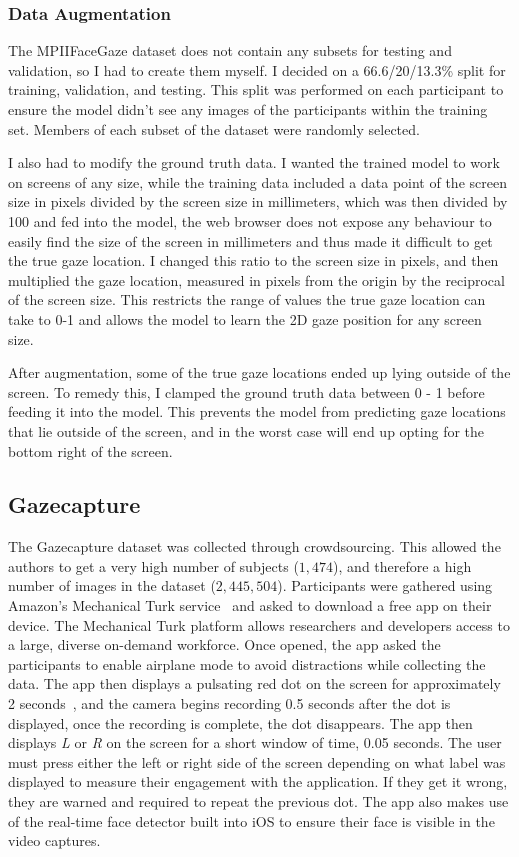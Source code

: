 \documentclass{report}
\begin{document}
\subsubsection{Data Augmentation}

The MPIIFaceGaze dataset does not contain any subsets for testing and validation, so I had to create them myself. I decided on a 66.6/20/13.3\% split for training, validation, and testing. This split was performed on each participant to ensure the model didn't see any images of the participants within the training set. Members of each subset of the dataset were randomly selected. 

I also had to modify the ground truth data. I wanted the trained model to work on screens of any size, while the training data included a data point of the screen size in pixels divided by the screen size in millimeters, which was then divided by 100 and fed into the model, the web browser does not expose any behaviour to easily find the size of the screen in millimeters and thus made it difficult to get the true gaze location. I changed this ratio to the screen size in pixels, and then multiplied the gaze location, measured in pixels from the origin by the reciprocal of the screen size. This restricts the range of values the true gaze location can take to 0-1 and allows the model to learn the 2D gaze position for any screen size. 

After augmentation, some of the true gaze locations ended up lying outside of the screen. To remedy this, I clamped the ground truth data between 0 - 1 before feeding it into the model. This prevents the model from predicting gaze locations that lie outside of the screen, and in the worst case will end up opting for the bottom right of the screen. 

\subsection{Gazecapture}\label{sec:gazecapture}

The Gazecapture dataset was collected through crowdsourcing. This allowed the authors to get a very high number of subjects ($1,474$), and therefore a high number of images in the dataset ($2,445,504$). Participants were gathered using Amazon's Mechanical Turk service~\cite{mturk} and asked to download a free app on their device. The Mechanical Turk platform allows researchers and developers access to a large, diverse on-demand workforce. Once opened, the app asked the participants to enable airplane mode to avoid distractions while collecting the data. The app then displays a pulsating red dot on the screen for approximately 2 seconds~\cite{krafka2016eye}, and the camera begins recording 0.5 seconds after the dot is displayed, once the recording is complete, the dot disappears. The app then displays \textit{L} or \textit{R} on the screen for a short window of time, 0.05 seconds. The user must press either the left or right side of the screen depending on what label was displayed to measure their engagement with the application. If they get it wrong, they are warned and required to repeat the previous dot. The app also makes use of the real-time face detector built into iOS to ensure their face is visible in the video captures.
\end{document}
